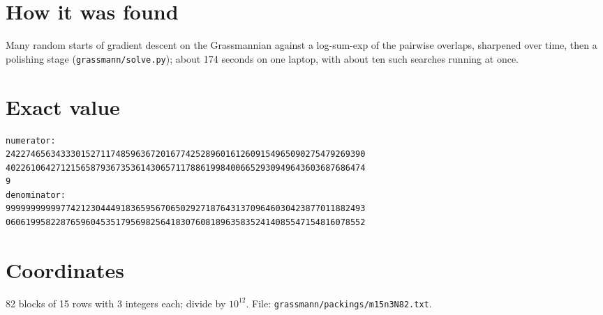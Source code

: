 \documentclass[11pt,a4paper]{article}
\begin{document}
\section{How it was found}
Many random starts of gradient descent on the Grassmannian against a log-sum-exp of the pairwise overlaps, sharpened over time, then a polishing stage (\texttt{grassmann/solve.py}); about 174 seconds on one laptop, with about ten such searches running at once.


\appendix
\section{Exact value}
{\small
\begin{verbatim}
numerator:
242274656343330152711748596367201677425289601612609154965090275479269390
402261064271215658793673536143065711788619984006652930949643603687686474
9
denominator:
999999999997742123044491836595670650292718764313709646030423877011882493
060619958228765960453517956982564183076081896358352414085547154816078552
\end{verbatim}}

\section{Coordinates}
82 blocks of 15 rows with 3 integers each; divide by $10^{12}$. File: \texttt{grassmann/packings/m15n3N82.txt}.
{\tiny
\begin{multicols}{3}
\end{multicols}}
\end{document}
